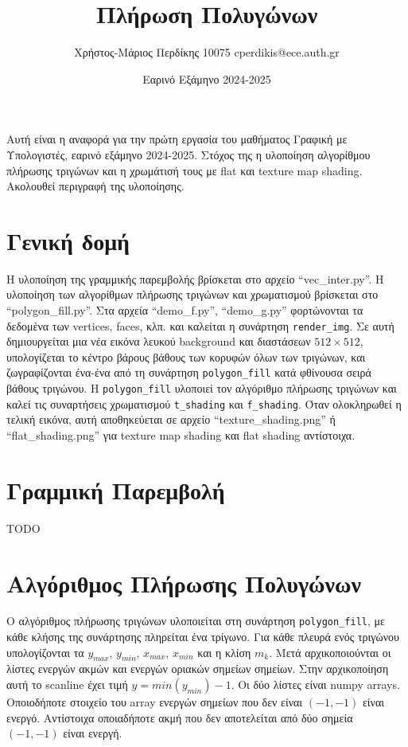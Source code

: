 \documentclass{article}
\title{Πλήρωση Πολυγώνων}
\date{Εαρινό Εξάμηνο 2024-2025}
\author{Χρήστος-Μάριος Περδίκης 10075 cperdikis@ece.auth.gr}
\begin{document}
\maketitle

Αυτή είναι η αναφορά για την πρώτη εργασία του μαθήματος Γραφική με 
Υπολογιστές, εαρινό εξάμηνο 2024-2025. Στόχος της η υλοποίηση αλγορίθμου
πλήρωσης τριγώνων και η χρωμάτισή τους με flat και texture map
shading. Ακολουθεί περιγραφή της υλοποίησης.

\section{Γενική δομή}
Η υλοποίηση της γραμμικής παρεμβολής βρίσκεται στο αρχείο ``vec\_inter.py''. 
Η υλοποίηση των αλγορίθμων πλήρωσης τριγώνων και χρωματισμού βρίσκεται στο
``polygon\_fill.py''. Στα αρχεία ``demo\_f.py'', ``demo\_g.py'' φορτώνονται 
τα δεδομένα των vertices, faces, κλπ. και καλείται η συνάρτηση \verb|render_img|.
Σε αυτή δημιουργείται μια νέα εικόνα λευκού background και διαστάσεων $512\times512$, υπολογίζεται το κέντρο 
βάρους βάθους των κορυφών όλων των τριγώνων, και ζωγραφίζονται 
ένα-ένα από τη συνάρτηση \verb|polygon_fill| κατά φθίνουσα σειρά βάθους τριγώνου.
Η \verb|polygon_fill| υλοποιεί τον αλγόριθμο πλήρωσης τριγώνων και καλεί τις 
συναρτήσεις χρωματισμού \verb|t_shading| και \verb|f_shading|. Όταν ολοκληρωθεί 
η τελική εικόνα, αυτή αποθηκεύεται σε αρχείο ``texture\_shading.png'' ή ``flat\_shading.png''
για texture map shading και flat shading αντίστοιχα.

\section{Γραμμική Παρεμβολή}
TODO

\section{Αλγόριθμος Πλήρωσης Πολυγώνων}
Ο αλγόριθμος πλήρωσης τριγώνων υλοποιείται στη συνάρτηση \verb|polygon_fill|,
με κάθε κλήσης της συνάρτησης πληρείται ένα τρίγωνο. Για κάθε πλευρά ενός 
τριγώνου υπολογίζονται τα $y_{max}$, $y_{min}$, $x_{max}$, $x_{min}$ 
και η κλίση $m_k$. Μετά αρχικοποιούνται οι λίστες ενεργών ακμών και ενεργών 
οριακών σημείων σημείων. Στην αρχικοποίηση αυτή το scanline έχει τιμή $y = min(y_{min}) - 1$.
Οι δύο λίστες είναι numpy arrays. Οποιοδήποτε στοιχείο του array ενεργών σημείων που δεν 
είναι $(-1, -1)$ είναι ενεργό. Αντίστοιχα οποιαδήποτε ακμή που δεν αποτελείται από 
δύο σημεία $(-1, -1)$ είναι ενεργή.
\end{document}
